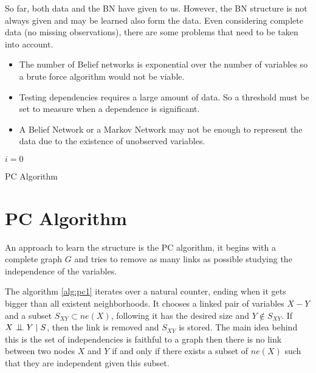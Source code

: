 
So far, both data and the BN have given to us. However, the BN structure is not
always given and may be learned also form the data. Even considering complete
data (no missing observations), there are some problems that need to be taken
into account.
\begin{itemize}
    \item The number of Belief networks is exponential over the number of
    variables so a brute force algorithm would not be viable.
  \item Testing dependencies requires a large amount of data. So a threshold
    must be set to measure when a dependence is significant.
    \item A Belief Network or a Markov Network may not be enough to represent
    the data due to the existence of unobserved variables.
\end{itemize}


\begin{algorithm}[h]
  \SetAlgoLined
  \(i = 0\)\;
  \caption{PC Algorithm}
  \label{alg:pc1}
\end{algorithm}

\section{PC Algorithm}

An approach to learn the structure is the PC algorithm, it begins with a
complete graph \(G\) and tries to remove as many links as possible studying the
independence of the variables.

The algorithm \ref{alg:pc1} iterates over a natural counter, ending when it gets bigger
than all existent neighborhoods. It chooses a linked pair of variables \(X - Y\) and
a subset \(S_{XY} \subset ne(X)\), following it has the desired size and
\(Y \notin S_{XY}\). If \(X \bigCI Y \mid S\), then the link is removed and
\(S_{XY}\) is stored. The main idea behind this is the set of independencies is
faithful to a graph then there is no link between two nodes \(X\) and \(Y\) if
and only if there exists a subset of \(ne(X)\) such that they are independent
given this subset.

